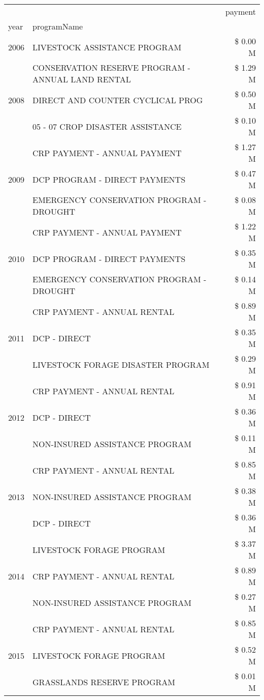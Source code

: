 \begin{tabular}{llr}
\toprule
 &  & payment \\
year & programName &  \\
\midrule
2006 & LIVESTOCK ASSISTANCE PROGRAM & \$ 0.00 M \\
\cline{1-3}
\multirow[t]{3}{*}{2008} & CONSERVATION RESERVE PROGRAM - ANNUAL LAND RENTAL & \$ 1.29 M \\
 & DIRECT AND COUNTER CYCLICAL PROG & \$ 0.50 M \\
 & 05 - 07 CROP DISASTER ASSISTANCE & \$ 0.10 M \\
\cline{1-3}
\multirow[t]{3}{*}{2009} & CRP PAYMENT - ANNUAL PAYMENT & \$ 1.27 M \\
 & DCP PROGRAM - DIRECT PAYMENTS & \$ 0.47 M \\
 & EMERGENCY CONSERVATION PROGRAM - DROUGHT & \$ 0.08 M \\
\cline{1-3}
\multirow[t]{3}{*}{2010} & CRP PAYMENT - ANNUAL PAYMENT & \$ 1.22 M \\
 & DCP PROGRAM - DIRECT PAYMENTS & \$ 0.35 M \\
 & EMERGENCY CONSERVATION PROGRAM - DROUGHT & \$ 0.14 M \\
\cline{1-3}
\multirow[t]{3}{*}{2011} & CRP PAYMENT - ANNUAL RENTAL & \$ 0.89 M \\
 & DCP - DIRECT & \$ 0.35 M \\
 & LIVESTOCK FORAGE DISASTER PROGRAM & \$ 0.29 M \\
\cline{1-3}
\multirow[t]{3}{*}{2012} & CRP PAYMENT - ANNUAL RENTAL & \$ 0.91 M \\
 & DCP - DIRECT & \$ 0.36 M \\
 & NON-INSURED ASSISTANCE PROGRAM & \$ 0.11 M \\
\cline{1-3}
\multirow[t]{3}{*}{2013} & CRP PAYMENT - ANNUAL RENTAL & \$ 0.85 M \\
 & NON-INSURED ASSISTANCE PROGRAM & \$ 0.38 M \\
 & DCP - DIRECT & \$ 0.36 M \\
\cline{1-3}
\multirow[t]{3}{*}{2014} & LIVESTOCK FORAGE PROGRAM & \$ 3.37 M \\
 & CRP PAYMENT - ANNUAL RENTAL & \$ 0.89 M \\
 & NON-INSURED ASSISTANCE PROGRAM & \$ 0.27 M \\
\cline{1-3}
\multirow[t]{3}{*}{2015} & CRP PAYMENT - ANNUAL RENTAL & \$ 0.85 M \\
 & LIVESTOCK FORAGE PROGRAM & \$ 0.52 M \\
 & GRASSLANDS RESERVE PROGRAM & \$ 0.01 M \\

\end{tabular}
